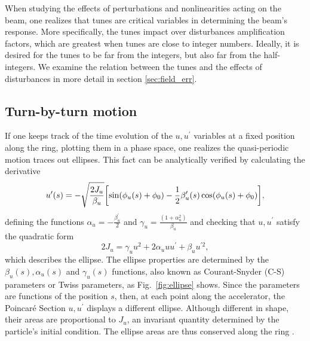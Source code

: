 When studying the effects of perturbations and nonlinearities acting on the beam, one realizes that tunes are critical variables in determining the beam's response. More specifically, the tunes impact over disturbances amplification factors, which are greatest when tunes are close to integer numbers. Ideally, it is desired for the tunes to be far from the integers, but also far from the half-integers. We examine the relation between the tunes and the effects of disturbances in more detail in section \ref{sec:field_err}.

\subsection{Turn-by-turn motion}
If one keeps track of the time evolution of the $u, u^\prime$ variables at a fixed position along the ring, plotting them in a phase space, one realizes the quasi-periodic motion traces out ellipses. This fact can be analytically verified by calculating the derivative
    \begin{equation}
        u^{\prime}(s) = - \sqrt{\frac{2J_u}{\beta_u}}\qty[\sin(\phi_u(s) + \phi_0) - \frac{1}{2}\beta_u^\prime(s)\cos(\phi_u(s) + \phi_0)],
        \label{eq:uprime}
    \end{equation}
    defining the functions $\alpha_u = -\frac{\beta_u^\prime}{2}$  and $\gamma_u = \frac{(1+\alpha_u^2)}{\beta_u}$ and checking that $u, u^\prime$ satisfy the quadratic form
    \begin{equation}
        2J_u=\gamma_u u^{2}+2\alpha_u u u^{\prime}+\beta_u u^{\prime2},
     \end{equation}
which describes the ellipse. The ellipse properties are determined by the $\beta_u(s), \alpha_u(s)$ and $\gamma_u(s)$ functions, also known as Courant-Snyder (C-S) parameters or Twiss parameters, as Fig.~\ref{fig:ellipse} shows. Since the parameters are functions of the position $s$, then, at each point along the accelerator, the Poincaré Section $u, u^\prime$ displays a different ellipse. Although different in shape, their areas are proportional to $J_u$, an invariant quantity determined by the particle's initial condition. The ellipse areas are thus conserved along the ring \cite{lee_accelerator_2004,wiedemann_particle_2015}.

